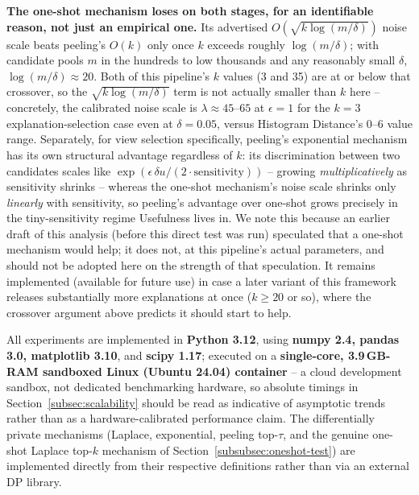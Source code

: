 \textbf{The one-shot mechanism loses on both stages, for an identifiable
reason, not just an empirical one.} Its advertised
$O(\sqrt{k\log(m/\delta)})$ noise scale beats peeling's $O(k)$ only once
$k$ exceeds roughly $\log(m/\delta)$; with candidate pools $m$ in the
hundreds to low thousands and any reasonably small $\delta$,
$\log(m/\delta)\approx20$. Both of this pipeline's $k$ values (3 and 35)
are at or below that crossover, so the $\sqrt{k\log(m/\delta)}$ term is
not actually smaller than $k$ here -- concretely, the calibrated noise
scale is $\lambda\approx45$--$65$ at $\epsilon{=}1$ for the $k{=}3$
explanation-selection case even at $\delta{=}0.05$, versus Histogram
Distance's 0--6 value range. Separately, for view selection specifically,
peeling's exponential mechanism has its own structural advantage
regardless of $k$: its discrimination between two candidates scales like
$\exp(\epsilon\,\delta u /(2\cdot\text{sensitivity}))$ -- growing
\emph{multiplicatively} as sensitivity shrinks -- whereas the one-shot
mechanism's noise scale shrinks only \emph{linearly} with sensitivity, so
peeling's advantage over one-shot grows precisely in the tiny-sensitivity
regime Usefulness lives in. We note this because an earlier draft of this
analysis (before this direct test was run) speculated that a one-shot
mechanism would help; it does not, at this pipeline's actual parameters,
and should not be adopted here on the strength of that speculation. It
remains implemented (available for future use) in case a later variant of
this framework releases substantially more explanations at once
($k \geq 20$ or so), where the crossover argument above predicts it should
start to help.


\label{subsec:implementation-details}

All experiments are implemented in \textbf{Python 3.12}, using
\textbf{numpy 2.4, pandas 3.0, matplotlib 3.10}, and \textbf{scipy 1.17};
executed on a \textbf{single-core, 3.9\,GB-RAM sandboxed Linux (Ubuntu
24.04) container} -- a cloud development sandbox, not dedicated
benchmarking hardware, so absolute timings in
Section~\ref{subsec:scalability} should be read as indicative of
asymptotic trends rather than as a hardware-calibrated performance claim.
The differentially private mechanisms (Laplace, exponential, peeling
top-$\tau$, and the genuine one-shot Laplace top-$k$ mechanism of
Section~\ref{subsubsec:oneshot-test}) are implemented directly from their
respective definitions rather than via an external DP library.

